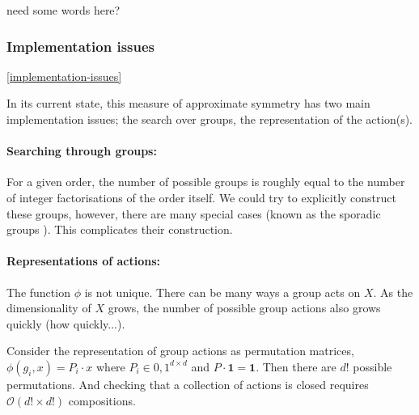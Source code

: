 
{\color{red}need some words here?}

\subsubsection{Implementation issues}\ref{implementation-issues}

In its current state, this measure of approximate symmetry has two main implementation issues;
the search over groups, the representation of the action(s).

\paragraph{Searching through groups:}\label{searching-through-groups} For a given order, the number of possible
groups is roughly equal to the number of integer factorisations of the order itself.
We could try to explicitly construct these groups, however, there are many special cases (known as the sporadic groups \cite{Conway1985}).
This complicates their construction\footnotemark.




\paragraph{Representations of actions:} The function $\phi$ is not unique. There can be many ways
a group acts on $X$. As the dimensionality of $X$ grows, the number of possible group actions also grows quickly {\color{red}(how quickly...)}.


Consider the representation of group actions as permutation matrices, $\phi(g_i, x) = P_i \cdot x$ where $P_i \in {0, 1}^{d\times d}$ and $P \cdot \mathbf 1 = \mathbf 1$.
Then there are $d!$ possible permutations.
 And checking that a collection of actions is closed requires $\mathcal O(d! \times d!)$ compositions.\footnotemark

